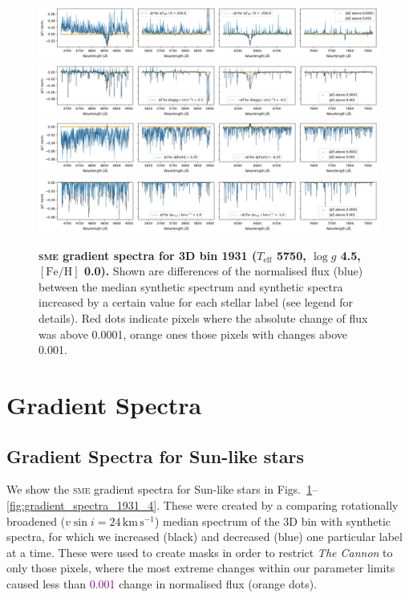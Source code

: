 \documentclass[
  journal=pasa,
  manuscript=research-paper, %
  year=2021,
  volume=37,
]{cup-journal}
\newcommand{\SB}[1]{{\textcolor{purple}{#1}}}
\newcommand{\Teff}{$T_\mathrm{eff}$\xspace}
\newcommand{\logg}{$\log g$\xspace}
\newcommand{\feh}{$\mathrm{[Fe/H]}$\xspace}
\newcommand{\TheCannon}{\textit{The Cannon}\xspace}
\newcommand{\sme}{\textsc{sme}\xspace}
\newcommand{\kms}{\,\mathrm{km\,s^{-1}}}	%
\begin{document}
\begin{figure}[!ht]
 \centering
 \includegraphics[width=\textwidth]{figures/gradient_spectrum_1931_teff.png}
 \includegraphics[width=\textwidth]{figures/gradient_spectrum_1931_logg.png}
 \includegraphics[width=\textwidth]{figures/gradient_spectrum_1931_fe_h.png}
 \includegraphics[width=\textwidth]{figures/gradient_spectrum_1931_vmic.png}
 \caption{\textbf{\sme gradient spectra for 3D bin 1931 (\Teff 5750, \logg 4.5, \feh 0.0).} Shown are differences of the normalised flux (blue) between the median synthetic spectrum and synthetic spectra increased by a certain value for each stellar label (see legend for details). Red dots indicate pixels where the absolute change of flux was above 0.0001, orange ones those pixels with changes above 0.001.
} \label{fig:gradient_spectra_1931_1}
\end{figure}

\appendix

\section{Gradient Spectra}

\subsection{Gradient Spectra for Sun-like stars}

We show the \sme gradient spectra for Sun-like stars in Figs.~\ref{fig:gradient_spectra_1931_1}--\ref{fig:gradient_spectra_1931_4}. These were created by a comparing rotationally broadened ($v \sin i = 24\kms$) median spectrum of the 3D bin with synthetic spectra, for which we increased (black) and decreased (blue) one particular label at a time. These were used to create masks in order to restrict \TheCannon to only those pixels, where the most extreme changes within our parameter limits caused less than \SB{0.001} change in normalised flux (orange dots).
\end{document}
